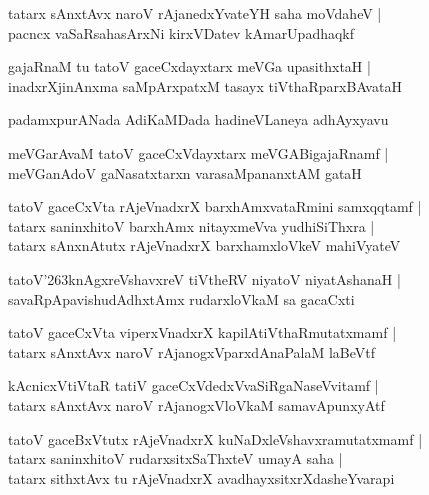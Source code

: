 \documentclass[twoside,12pt,openright]{book}
\def\S{\char'263}
\newcounter{shloka}[chapter]
\begin{document}
\begin{shloka}
tatarx sAnxtAvx naroV rAjanedxYvateYH saha moVdaheV |\\
pacncx vaSaRsahasArxNi kirxVDatev kAmarUpadhaqkf
\end{shloka}

\begin{shloka}
gajaRnaM tu tatoV gaceCxdayxtarx meVGa upasithxtaH |\\
inadxrXjinAnxma saMpArxpatxM tasayx tiVthaRparxBAvataH 
\end{shloka}

\begin{center}
padamxpurANada AdiKaMDada hadineVLaneya adhAyxyavu
\end{center}


\begin{shloka}
meVGarAvaM tatoV gaceCxVdayxtarx meVGABigajaRnamf |\\
meVGanAdoV gaNasatxtarxn varasaMpananxtAM gataH
\end{shloka}

\begin{shloka}
tatoV gaceCxVta rAjeVnadxrX barxhAmxvataRmini samxqqtamf |\\
tatarx saninxhitoV barxhAmx nitayxmeVva yudhiSiThxra |\\
tatarx sAnxnAtutx rAjeVnadxrX barxhamxloVkeV mahiVyateV 
\end{shloka}

\begin{shloka}
tatoV\S knAgxreVshavxreV tiVtheRV niyatoV niyatAshanaH |\\
savaRpApavishudAdhxtAmx rudarxloVkaM sa gacaCxti 
\end{shloka}

\begin{shloka}
tatoV gaceCxVta viperxVnadxrX kapilAtiVthaRmutatxmamf |\\
tatarx sAnxtAvx naroV rAjanogxVparxdAnaPalaM laBeVtf
\end{shloka}

\begin{shloka}
kAcnicxVtiVtaR tatiV gaceCxVdedxVvaSiRgaNaseVvitamf |\\
tatarx sAnxtAvx naroV rAjanogxVloVkaM samavApunxyAtf
\end{shloka}

\begin{shloka}
tatoV gaceBxVtutx rAjeVnadxrX kuNaDxleVshavxramutatxmamf |\\
tatarx saninxhitoV rudarxsitxSaThxteV umayA saha |\\
tatarx sithxtAvx tu rAjeVnadxrX avadhayxsitxrXdasheYvarapi
\end{shloka}
\end{document}
